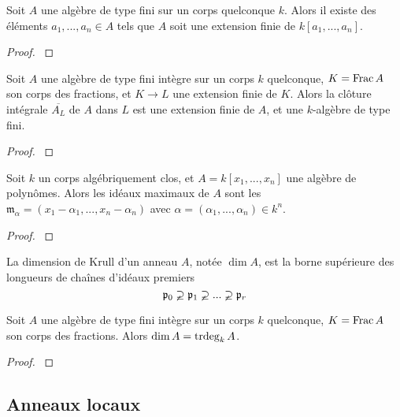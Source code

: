 \begin{thm}\label{NoetherNormalisation}
Soit $A$ une algèbre de type fini sur un corps quelconque $k$. Alors il existe des éléments $a_1,...,a_n\in A$ tels que $A$ soit une extension finie de $k[a_1,...,a_n]$.
\end{thm}
\begin{proof}
\cite[I.1]{MumfordRedBook} 
\end{proof}

\begin{thm}\label{IntClosureFinite}
Soit $A$ une algèbre de type fini intègre sur un corps $k$ quelconque, $K=\operatorname{Frac} A$ son corps des fractions, et $K\rightarrow L$ une extension finie de $K$. Alors la clôture intégrale $\overline{A_L}$ de $A$ dans $L$ est une extension finie de $A$, et une $k$-algèbre de type fini.
\end{thm}
\begin{proof}
\cite[4.14]{Eisenbud} 
\end{proof}

\begin{thm}[Nullstellensatz]\label{Nullstellensatz}
Soit $k$ un corps algébriquement clos, et $A=k[x_1,...,x_n]$ une algèbre de polynômes. Alors les idéaux maximaux de $A$ sont les $\mathfrak{m}_\alpha=(x_1-\alpha_1,...,x_n-\alpha_n)$ avec $\alpha=(\alpha_1,...,\alpha_n)\in k^n$.
\end{thm}
\begin{proof}
\cite[5.3]{Matsumura}
\end{proof}

\begin{defn}
La dimension de Krull d'un anneau $A$, notée $\dim A$, est la borne supérieure des longueurs de chaînes d'idéaux premiers
$$\mathfrak{p}_0\varsupsetneq \mathfrak{p}_1 \varsupsetneq...\varsupsetneq  \mathfrak{p}_r$$
\end{defn}

\begin{thm}\label{FundamentalDimTheory}
Soit $A$ une algèbre de type fini intègre sur un corps $k$ quelconque, $K=\operatorname{Frac} A$ son corps des fractions. Alors $\dim A=\operatorname{trdeg}_k A$.
\end{thm}
\begin{proof}
\cite[5.6]{Matsumura}
\end{proof}

\subsection{Anneaux locaux}

